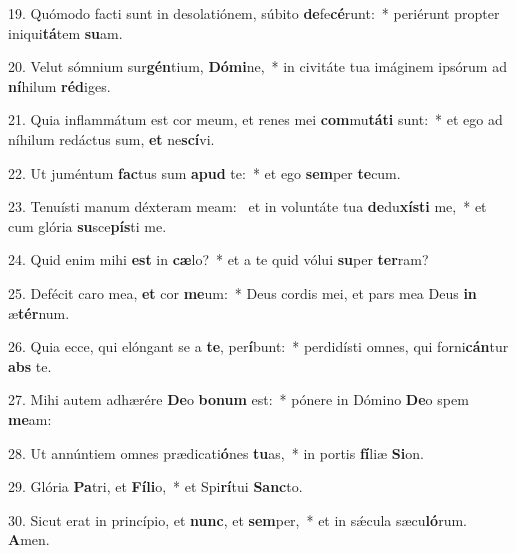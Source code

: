 19. Quómodo facti sunt in desolatiónem, súbito \textbf{de}fe\textbf{cé}runt:~*  periérunt propter iniqui\textbf{tá}tem \textbf{su}am.\

20. Velut sómnium sur\textbf{gén}tium, \textbf{Dó}\textbf{mi}ne,~*  in civitáte tua imáginem ipsórum ad \textbf{ní}hilum \textbf{réd}iges.\

21. Quia inflammátum est cor meum, et renes mei \textbf{com}mu\textbf{tá}\textbf{ti} sunt:~*  et ego ad níhilum redáctus sum, \textbf{et} ne\textbf{scí}vi.\

22. Ut juméntum \textbf{fac}tus sum \textbf{a}\textbf{pud} te:~*  et ego \textbf{sem}per \textbf{te}cum.\

23. Tenuísti manum déxteram meam: \dag\  et in voluntáte tua \textbf{de}du\textbf{xís}\textbf{ti} me,~*  et cum glória \textbf{su}sce\textbf{pís}ti me.\

24. Quid enim mihi \textbf{est} in \textbf{cæ}lo?~*  et a te quid vólui \textbf{su}per \textbf{ter}ram?\

25. Defécit caro mea, \textbf{et} cor \textbf{me}um:~*  Deus cordis mei, et pars mea Deus \textbf{in} æ\textbf{tér}num.\

26. Quia ecce, qui elóngant se a \textbf{te}, per\textbf{í}bunt:~*  perdidísti omnes, qui forni\textbf{cán}tur \textbf{abs} te.\

27. Mihi autem adhærére \textbf{De}o \textbf{bo}\textbf{num} est:~*  pónere in Dómino \textbf{De}o spem \textbf{me}am:\

28. Ut annúntiem omnes prædicati\textbf{ó}nes \textbf{tu}as,~*  in portis \textbf{fí}liæ \textbf{Si}on.\

29. Glória \textbf{Pa}tri, et \textbf{Fí}\textbf{li}o,~*  et Spi\textbf{rí}tui \textbf{Sanc}to.\

30. Sicut erat in princípio, et \textbf{nunc}, et \textbf{sem}per,~*  et in sǽcula sæcu\textbf{ló}rum. \textbf{A}men.\

